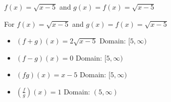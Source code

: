 {$f(x) =\sqrt{x-5}$ and $g(x) = f(x) = \sqrt{x-5}$}
{For   $f(x) = \sqrt{x-5}$ and $g(x) = f(x) = \sqrt{x-5}$

\begin{itemize}
\item $(f+g)(x) = 2\sqrt{x-5}$
      Domain: $[5,\infty)$
\item $(f-g)(x) =0$
       Domain: $[5,\infty)$
\item $(fg)(x) =x-5$
       Domain: $[5,\infty)$
\item $\left(\frac{f}{g}\right)(x) =1$
       Domain: $(5,\infty)$
\end{itemize}
}